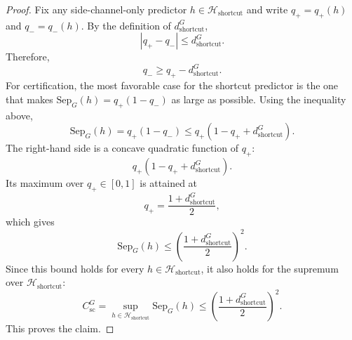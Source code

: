 \documentclass[conference]{IEEEtran}
\theoremstyle{remark}
\newcommand{\Sep}{\mathrm{Sep}}
\newcommand{\shortcutDisc}{d_{\mathrm{shortcut}}^{G}}
\newcommand{\shortcutHypCls}{\mathcal{H}_{\mathrm{shortcut}}}
\newcommand{\shortcutPosRate}[1]{q_{+}(#1)}
\newcommand{\shortcutNegRate}[1]{q_{-}(#1)}
\newcommand{\shortcutCeiling}{C_{\mathrm{sc}}^{G}}
\newcommand{\shortcutPosRateVar}{q_{+}}
\newcommand{\shortcutNegRateVar}{q_{-}}
\begin{document}
\begin{proof}
Fix any side-channel-only predictor $h\in\shortcutHypCls$ and write
$\shortcutPosRateVar=\shortcutPosRate{h}$ and $\shortcutNegRateVar=\shortcutNegRate{h}$.
By the definition of $\shortcutDisc$,
\begin{equation}\label{eq:formula-21}
|\shortcutPosRateVar-\shortcutNegRateVar|\le \shortcutDisc .
\end{equation}
Therefore,
\begin{equation}\label{eq:formula-22}
\shortcutNegRateVar\ge \shortcutPosRateVar-\shortcutDisc .
\end{equation}
For certification, the most favorable case for the shortcut predictor is the
one that makes $\Sep_G(h)=\shortcutPosRateVar(1-\shortcutNegRateVar)$ as large as possible.
Using the inequality above,
\begin{equation}\label{eq:formula-23}
\Sep_G(h)
=
\shortcutPosRateVar(1-\shortcutNegRateVar)
\le
\shortcutPosRateVar(1-\shortcutPosRateVar+\shortcutDisc).
\end{equation}
The right-hand side is a concave quadratic function of $\shortcutPosRateVar$:
\begin{equation}\label{eq:formula-24}
\shortcutPosRateVar(1-\shortcutPosRateVar+\shortcutDisc).
\end{equation}
Its maximum over $\shortcutPosRateVar\in[0,1]$ is attained at
\begin{equation}\label{eq:formula-25}
\shortcutPosRateVar=\frac{1+\shortcutDisc}{2},
\end{equation}
which gives
\begin{equation}\label{eq:formula-26}
\Sep_G(h)
\le
\left(\frac{1+\shortcutDisc}{2}\right)^2.
\end{equation}
Since this bound holds for every $h\in\shortcutHypCls$, it also holds for the supremum over
$\shortcutHypCls$:
\begin{equation}\label{eq:formula-27}
\shortcutCeiling
=
\sup_{h\in\shortcutHypCls}\Sep_G(h)
\le
\left(\frac{1+\shortcutDisc}{2}\right)^2.
\end{equation}
This proves the claim.
\end{proof}
\end{document}
